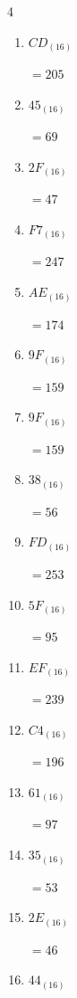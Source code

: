 \begin{multicols}{4}
\begin{enumerate}
        $=80$

  \item $CD_{(16)}$

        $=205$

  \item $45_{(16)}$

        $=69$

  \item $2F_{(16)}$

        $=47$

  \item $F7_{(16)}$

        $=247$

  \item $AE_{(16)}$

        $=174$

  \item $9F_{(16)}$

        $=159$

  \item $9F_{(16)}$

        $=159$

  \item $38_{(16)}$

        $=56$

\columnbreak %

\resetques

  \item $FD_{(16)}$

        $=253$

  \item $5F_{(16)}$

        $=95$

  \item $EF_{(16)}$

        $=239$

  \item $C4_{(16)}$

        $=196$

  \item $61_{(16)}$

        $=97$

  \item $35_{(16)}$

        $=53$

  \item $2E_{(16)}$

        $=46$

  \item $44_{(16)}$


\end{enumerate}
\end{multicols}
